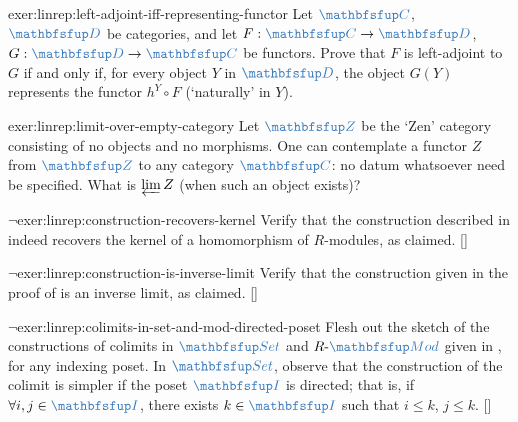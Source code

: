 \begin{exer}{}{exer:linrep:left-adjoint-iff-representing-functor}
  Let $\categ{C}$, $\categ{D}$ be categories, and let
  $F : \categ{C} \to \categ{D}$, $G : \categ{D} \to \categ{C}$ be
  functors. Prove that $F$ is left-adjoint to $G$ if and only if, for
  every object $Y$ in $\categ{D}$, the object $G(Y)$ represents the
  functor $h^Y \circ F$ (`naturally' in $Y$).
\end{exer}

\begin{exer}{}{exer:linrep:limit-over-empty-category}
  Let $\categ{Z}$ be the `Zen' category consisting of no objects and
  no morphisms. One can contemplate a functor $Z$ from $\categ{Z}$ to
  any category $\categ{C}$: no datum whatsoever need be
  specified. What is $\varprojlim Z$ (when such an object exists)?
\end{exer}

\begin{exer}{$\lnot$}{exer:linrep:construction-recovers-kernel}
  Verify that the construction described in 
  indeed recovers the kernel of a homomorphism of $R$-modules, as
  claimed. []
\end{exer}

\begin{exer}{$\lnot$}{exer:linrep:construction-is-inverse-limit}
  Verify that the construction given in the proof of
   is an inverse limit, as
  claimed. []
\end{exer}

\begin{exer}{$\lnot$}{exer:linrep:colimits-in-set-and-mod-directed-poset}
  Flesh out the sketch of the constructions of colimits in
  $\categ{Set}$ and $R\text{-}\categ{Mod}$ given in
  , for any indexing poset.
  In $\categ{Set}$, observe that the construction of the colimit is
  simpler if the poset $\categ{I}$ is directed; that is, if
  $\forall i, j \in \categ{I}$, there exists $k \in \categ{I}$ such
  that $i \leq k$, $j \leq
  k$. []
\end{exer}

